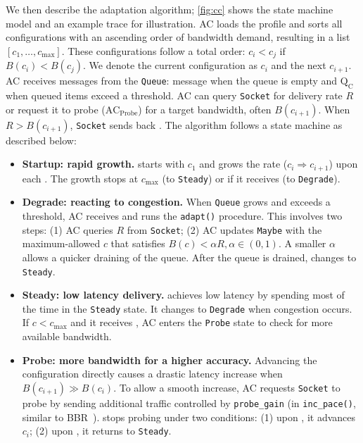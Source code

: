 We then describe the adaptation algorithm; \autoref{fig:cc} shows the state machine model and an example trace for illustration.
AC loads the profile and sorts all configurations with an
ascending order of bandwidth demand, resulting in a list $[c_1, \dots,
c_{\max}]$.
These configurations follow a total order: $c_i < c_j$ if $B(c_i) < B(c_j)$.
We denote the current configuration as $c_i$ and the next $c_{i+1}$.
AC receives messages from the \texttt{Queue}: message \qe{} when the queue is empty
and $\text{Q}_\text{C}$ when queued items exceed a threshold. AC can query
\texttt{Socket} for delivery rate $R$ or request it to probe ($\text{AC}_{\text{Probe}}$) for a target
bandwidth, often $B(c_{i+1})$. When $R > B(c_{i+1})$, \texttt{Socket} sends back
\spd{}. The algorithm follows a state machine as described below:

\begin{itemize}[leftmargin=*]

\item \textbf{Startup: rapid growth.} \sysname{} starts with $c_1$ and grows the
  rate ($c_i \Rightarrow c_{i+1}$) upon each \qe{}. The growth stops at
  $c_{\max}$ (to \texttt{Steady}) or if it receives \qc{} (to \texttt{Degrade}).

\item \textbf{Degrade: reacting to congestion.} When \texttt{Queue} grows and
  exceeds a threshold, AC receives \qc{} and runs the \texttt{adapt()}
  procedure. This involves two steps: (1) AC queries $R$ from \texttt{Socket};
  (2) AC updates \texttt{Maybe} with the maximum-allowed $c$ that satisfies
  $B(c) < \alpha R, \alpha \in (0, 1)$. A smaller $\alpha$ allows a quicker
  draining of the queue. After the queue is drained, \sysname{} changes to
  \texttt{Steady}.

\item \textbf{Steady: low latency delivery.} \sysname{} achieves low latency by
  spending most of the time in the \texttt{Steady} state. It changes to
  \texttt{Degrade} when congestion occurs. If $c < c_{\max}$ and it receives
  \qe{}, AC enters the \texttt{Probe} state to check for more available
  bandwidth.

\item \textbf{Probe: more bandwidth for a higher accuracy.} Advancing the configuration
  directly causes a drastic latency increase when $B(c_{i+1}) \gg B(c_i)$. To
  allow a smooth increase, AC requests \texttt{Socket} to probe by sending
  additional traffic controlled by \texttt{probe\_gain} (in
  \texttt{inc\_pace()}, similar to BBR~\cite{cardwell2017bbr}). \sysname{} stops
  probing under two conditions: (1) upon \spd{}, it advances $c_i$; (2) upon
  \qc{}, it returns to \texttt{Steady}.

\end{itemize}

